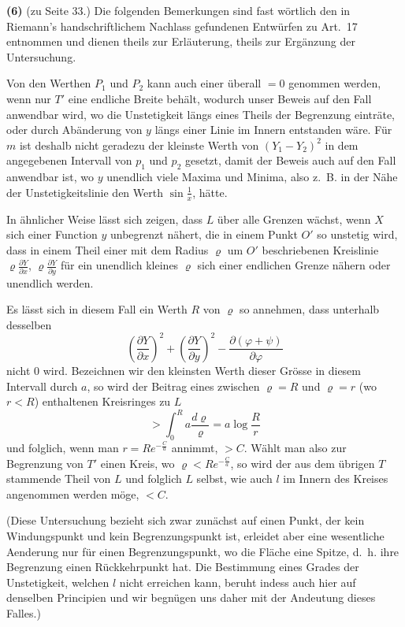 \documentclass[12pt,a4paper]{book}
\theoremstyle{definition}
\theoremstyle{remark}
\begin{document}
\textbf{(6)} (zu Seite 33.) Die folgenden Bemerkungen sind fast wörtlich den in Riemann's handschriftlichem Nachlass gefundenen Entwürfen zu Art.~17 entnommen und dienen theils zur Erläuterung, theils zur Ergänzung der Untersuchung.

Von den Werthen $P_1$ und $P_2$ kann auch einer überall $= 0$ genommen werden, wenn nur $T'$ eine endliche Breite behält, wodurch unser Beweis auf den Fall anwendbar wird, wo die Unstetigkeit längs eines Theils der Begrenzung einträte, oder durch Abänderung von $y$ längs einer Linie im Innern entstanden wäre. Für $m$ ist deshalb nicht geradezu der kleinste Werth von $(Y_1 - Y_2)^2$ in dem angegebenen Intervall von $p_1$ und $p_2$ gesetzt, damit der Beweis auch auf den Fall anwendbar ist, wo $y$ unendlich viele Maxima und Minima, also z.~B. in der Nähe der Unstetigkeitslinie den Werth $\sin \frac{1}{x}$, hätte.

In ähnlicher Weise lässt sich zeigen, dass $L$ über alle Grenzen wächst, wenn $X$ sich einer Function $y$ unbegrenzt nähert, die in einem Punkt $O'$ so unstetig wird, dass in einem Theil einer mit dem Radius $\varrho$ um $O'$ beschriebenen Kreislinie $\varrho \frac{\partial Y}{\partial x}$, $\varrho \frac{\partial Y}{\partial y}$ für ein unendlich kleines $\varrho$ sich einer endlichen Grenze nähern oder unendlich werden.

Es lässt sich in diesem Fall ein Werth $R$ von $\varrho$ so annehmen, dass unterhalb desselben
\[
\left(\frac{\partial Y}{\partial x}\right)^2 + \left(\frac{\partial Y}{\partial y}\right)^2 - \frac{\partial (\varphi + \psi)}{\partial \varphi}
\]
nicht $0$ wird. Bezeichnen wir den kleinsten Werth dieser Grösse in diesem Intervall durch $a$, so wird der Beitrag eines zwischen $\varrho = R$ und $\varrho = r$ (wo $r < R$) enthaltenen Kreisringes zu $L$
\[
> \int_0^R a \frac{d\varrho}{\varrho} = a \log \frac{R}{r}
\]
und folglich, wenn man $r = R e^{-\frac{C}{a}}$ annimmt, $> C$. Wählt man also zur Begrenzung von $T'$ einen Kreis, wo $\varrho < R e^{-\frac{C}{a}}$, so wird der aus dem übrigen $T$ stammende Theil von $L$ und folglich $L$ selbst, wie auch $l$ im Innern des Kreises angenommen werden möge, $< C$.

(Diese Untersuchung bezieht sich zwar zunächst auf einen Punkt, der kein Windungspunkt und kein Begrenzungspunkt ist, erleidet aber eine wesentliche Aenderung nur für einen Begrenzungspunkt, wo die Fläche eine Spitze, d.~h. ihre Begrenzung einen Rückkehrpunkt hat. Die Bestimmung eines Grades der Unstetigkeit, welchen $l$ nicht erreichen kann, beruht indess auch hier auf denselben Principien und wir begnügen uns daher mit der Andeutung dieses Falles.)
\end{document}
